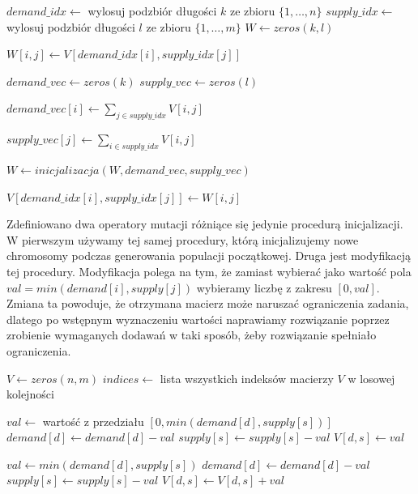 \begin{pseudokod}
    
    $demand\_idx \gets$ wylosuj podzbiór długości $k$ ze zbioru $\{1, \dots, n\}$\;
    $supply\_idx \gets$ wylosuj podzbiór długości $l$ ze zbioru $\{1, \dots, m\}$\;
    $W \gets zeros(k, l)$

     {
         {
            $W[i, j] \gets V[demand\_idx[i], supply\_idx[j]]$\;
        }
    }
    
    $demand\_vec \gets zeros(k)$
    $supply\_vec \gets zeros(l)$
    
     {
        $demand\_vec[i] \gets \sum_{j \in supply\_idx} V[i, j]$\;
    }
    
     {
        $supply\_vec[j] \gets \sum_{i \in supply\_idx} V[i, j]$\;
    }
    
    $W \gets inicjalizacja(W, demand\_vec, supply\_vec)$\;
    
     {
         {
            $V[demand\_idx[i], supply\_idx[j]] \gets W[i, j]$\;
        }
    }
    
\end{pseudokod}

Zdefiniowano dwa operatory mutacji różniące się jedynie procedurą inicjalizacji. W pierwszym używamy tej samej procedury, którą inicjalizujemy 
nowe chromosomy podczas generowania populacji początkowej. Druga jest modyfikacją tej procedury. Modyfikacja polega na tym, że zamiast wybierać 
jako wartość pola $val = min(demand[i], supply[j])$ wybieramy liczbę z zakresu $[0, val]$. Zmiana ta powoduje, że otrzymana macierz może naruszać 
ograniczenia zadania, dlatego po wstępnym wyznaczeniu wartości naprawiamy rozwiązanie poprzez zrobienie wymaganych dodawań w taki sposób, żeby 
rozwiązanie spełniało ograniczenia.

\begin{pseudokod}
    $V \gets zeros(n, m)$
    $indices \gets$ lista wszystkich indeksów macierzy $V$ w losowej kolejności\;
    
     {
        $val \gets$ wartość z przedziału $[0, min(demand[d], supply[s])]$\;
        $demand[d] \gets demand[d] - val$\;
        $supply[s] \gets supply[s] - val$\;
        $V[d, s] \gets val$\;
    }

     {
        $val \gets min(demand[d], supply[s])$\;
        $demand[d] \gets demand[d] - val$\;
        $supply[s] \gets supply[s] - val$\;
        $V[d, s] \gets V[d, s] + val$\;
    }

\end{pseudokod}

